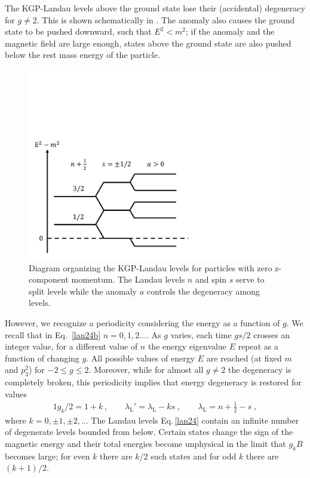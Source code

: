 The KGP-Landau levels above the ground state lose their (accidental) degeneracy for $g\neq 2$. This is shown schematically in . The anomaly also causes the ground state to be pushed downward, such that $E^{2}<m^{2}$; if the anomaly and the magnetic field are large enough, states above the ground state are also pushed below the rest mass energy of the particle.

\begin{figure}
 \centering
 \includegraphics[clip, trim=0.0cm 0.0cm 9.0cm 7.0cm,width=0.6\linewidth]{plots/chap02moment/lanplot04.pdf}
 \caption[]{Diagram organizing the KGP-Landau levels for particles with zero z-component momentum. The Landau levels $n$ and spin $s$ serve to split levels while the anomaly $a$ controls the degeneracy among levels.}
 \label{f04}
\end{figure}

However, we recognize a periodicity considering the energy as a function of $g$. We recall that in Eq.~\eqref{lan24b} $n=0, 1, 2\ldots$. As $g$ varies, each time $gs/2$ crosses an integer value, for a different value of $n$ the energy eigenvalue $E$ repeat as a function of changing $g$. All possible values of energy $E$ are reached (at fixed $m$ and $p^2_3$) for $-2\le g\le 2$. Moreover, while for almost all $g\ne 2$ the degeneracy is completely broken, this periodicity implies that energy degeneracy is restored for values~\cite{Evans:2022ygl,Evans:2022fsu} 
\begin{alignat}{1}
\label{lan26}
g_{k}/2=1+k\,,\qquad
\lambda_\mathrm{L}'=\lambda_\mathrm{L}-ks\;,\qquad
\lambda_\mathrm{L}=n+\frac{1}{2}-s\;,
\end{alignat}
where $k=0,\pm1,\pm2,\ldots$ The Landau levels Eq.\,\eqref{lan24} contain an infinite number of degenerate levels bounded from below. Certain states change the sign of the magnetic energy and their total energies become unphysical in the limit that $g_{k}B$ becomes large; for even $k$ there are $k/2$ such states and for odd $k$ there are $(k+1)/2$.

